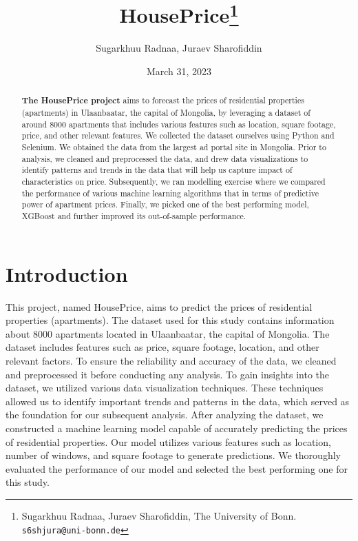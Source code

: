 \documentclass[11pt, a4paper, leqno]{article}
\date{March 31, 2023}
\begin{document}
\title{HousePrice\thanks{Sugarkhuu Radnaa, Juraev Sharofiddin, The University of Bonn. \texttt{s6shjura@uni-bonn.de}}}

\author{Sugarkhuu Radnaa, Juraev Sharofiddin}

\maketitle


\begin{abstract}
    \textbf{The HousePrice project} aims to forecast the prices of residential properties (apartments) in Ulaanbaatar,
    the capital of Mongolia, by leveraging a dataset of around 8000 apartments that includes various features such as location,
    square footage, price, and other relevant features. We collected the dataset ourselves using
    Python and Selenium. We obtained the data from the largest ad portal site in Mongolia.
    Prior to analysis, we cleaned and preprocessed the data, and drew data visualizations
    to identify patterns and trends in the data that will help us capture impact of characteristics on price. Subsequently, we ran modelling exercise where we compared the performance of various machine learning
    algorithms that in terms of predictive power of apartment prices. Finally, we picked one of the best performing model, XGBoost
    and further improved its out-of-sample performance.
\end{abstract}

\clearpage


\section{Introduction} %
\label{sec:introduction}

This project, named HousePrice, aims to predict the prices of residential properties (apartments).
The dataset used for this study contains information about 8000 apartments located in Ulaanbaatar, the capital of Mongolia.
The dataset includes features such as price, square footage, location, and other relevant factors.
To ensure the reliability and accuracy of the data, we cleaned and preprocessed it before conducting any analysis.
To gain insights into the dataset, we utilized various data visualization techniques.
These techniques allowed us to identify important trends and patterns in the data, which served as the foundation for our subsequent analysis.
After analyzing the dataset, we constructed a machine learning model capable of accurately predicting the prices of residential properties.
Our model utilizes various features such as location, number of windows, and square footage to generate predictions.
We thoroughly evaluated the performance of our model and selected the best performing one for this study.
\end{document}
